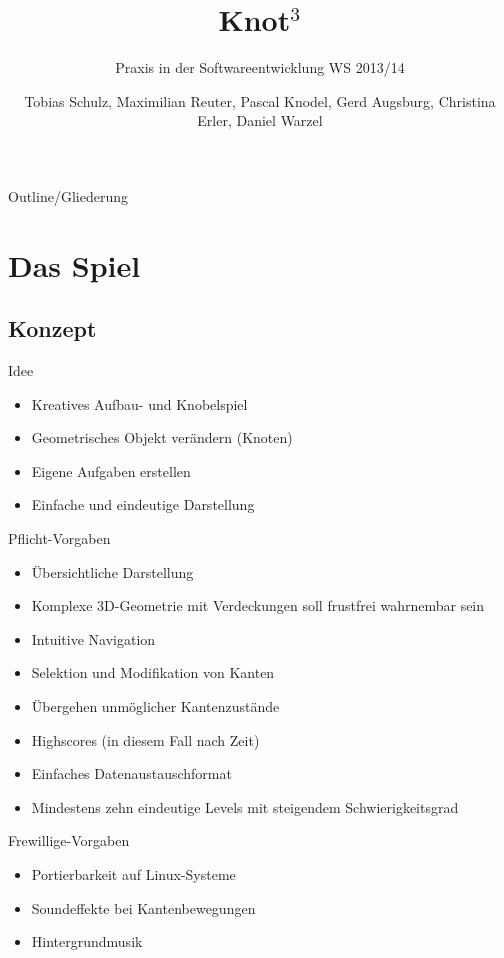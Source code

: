 \documentclass[18pt]{beamer}
\title[Short title]{Knot$^3$ }
\subtitle{Praxis in der Softwareentwicklung WS 2013/14}
\author{ Tobias Schulz, Maximilian Reuter, Pascal Knodel, Gerd Augsburg, Christina Erler, Daniel Warzel}
\institute{Institut für Betriebs- und Dialogsysteme, Lehrstuhl für Computergrafik}
\begin{document}

\begin{frame}
\titlepage
\end{frame}

\begin{frame}{Outline/Gliederung}
\tableofcontents
\end{frame}

\section{Das Spiel}
\subsection{Konzept}
\begin{frame}{Idee}
\begin{itemize}
\item Kreatives Aufbau- und Knobelspiel
\item Geometrisches Objekt verändern (Knoten)
\item Eigene Aufgaben erstellen
\item Einfache und eindeutige Darstellung
\end{itemize}
\end{frame}
\begin{frame}{Pflicht-Vorgaben}
\begin{itemize}
\item Übersichtliche Darstellung
\item Komplexe 3D-Geometrie mit Verdeckungen soll frustfrei wahrnembar sein
\item Intuitive Navigation
\item Selektion und Modifikation von Kanten
\item Übergehen unmöglicher Kantenzustände
\item Highscores (in diesem Fall nach Zeit)
\item Einfaches Datenaustauschformat
\item Mindestens zehn eindeutige Levels mit steigendem Schwierigkeitsgrad
\end{itemize}
\end{frame}

\begin{frame}{Frewillige-Vorgaben}
\begin{itemize}
\item Portierbarkeit auf Linux-Systeme
\item Soundeffekte bei Kantenbewegungen
\item Hintergrundmusik
\end{itemize}
\end{frame}
\end{document}
